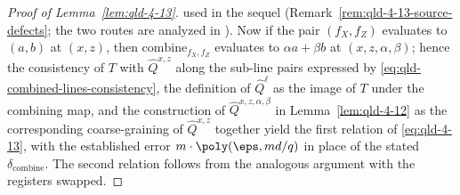 \begin{proof}[Proof of Lemma~\ref{lem:qld-4-13}]
	used in the sequel (Remark~\ref{rem:qld-4-13-source-defects}; the two
	routes are analyzed in \cite{gap:qpbt_combined-lines-error-term}). Now
	if the pair $(f_X, f_Z)$ evaluates to $(a, b)$ at $(x, z)$, then
	$\mathrm{combine}_{f_X,f_Z}$ evaluates to $\alpha a + \beta b$ at
	$(x, z, \alpha, \beta)$; hence the consistency of $T$ with
	$\hat{Q}^{x,z}$ along the sub-line pairs expressed by
	\eqref{eq:qld-combined-lines-consistency}, the definition of
	$\hat{Q}^{\ell}$ as the image of $T$ under the combining map, and the
	construction of $\hat{Q}^{x,z,\alpha,\beta}$ in
	Lemma~\ref{lem:qld-4-12} as the corresponding coarse-graining of
	$\hat{Q}^{x,z}$ together yield the first relation of
	\eqref{eq:qld-4-13}, with the established error
	$m \cdot \poly(\eps, md/q)$ in place of the stated
	$\delta_{\mathrm{combine}}$. The second relation follows from the
	analogous argument with the registers swapped.
\end{proof}

